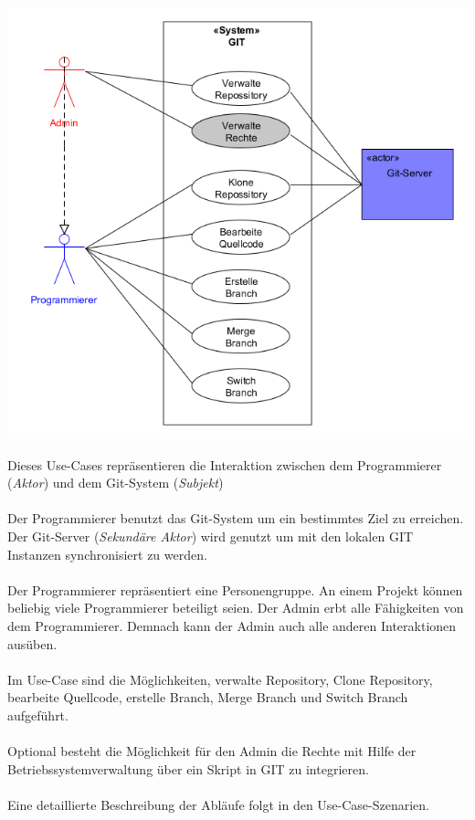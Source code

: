 \documentclass[a4paper]{article}
\begin{document}
\includegraphics[width=15cm]{Use-Case-Modell.png}	

Dieses Use-Cases repräsentieren die Interaktion zwischen dem Programmierer (\textit{Aktor}) und dem Git-System (\textit{Subjekt})\\  							%
\\ 														%
Der Programmierer benutzt das Git-System um ein bestimmtes Ziel zu erreichen. 
Der Git-Server (\textit{Sekundäre Aktor}) wird genutzt um mit den lokalen GIT Instanzen synchronisiert zu werden.\\
\\
Der Programmierer repräsentiert eine Personengruppe. An einem Projekt können beliebig viele Programmierer beteiligt seien.  
Der Admin erbt alle Fähigkeiten von dem Programmierer. Demnach kann der Admin auch alle anderen Interaktionen ausüben.  \\
\\
Im Use-Case sind die Möglichkeiten, verwalte Repository, \gls{Clone} Repository, bearbeite Quellcode, erstelle Branch, Merge Branch und \gls{Switch} Branch aufgeführt.\\\\Optional besteht die Möglichkeit für den Admin die Rechte mit Hilfe der Betriebssystemverwaltung über ein Skript in GIT zu integrieren.\\
\\
Eine detaillierte Beschreibung der Abläufe folgt in den Use-Case-Szenarien. 
\end{document}
